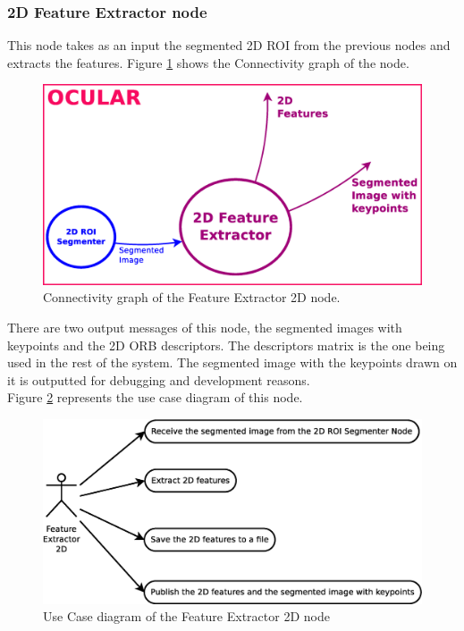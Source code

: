 
\subsubsection{2D Feature Extractor node}

	This node takes as an input the segmented 2D ROI from the previous nodes and extracts the features. 
	Figure \ref{node_fe2d} shows the Connectivity graph of the node. 

		\begin{figure}[H]
			\begin{center}
			\includegraphics[width=0.5\linewidth]{img/diagrams/node_fe2d.eps}
			\caption[Feature Extractor 2D node I/O]{Connectivity graph of the Feature Extractor 2D node.}		
			\label{node_fe2d}
			\end{center}
		\end{figure}

	There are two output messages of this node, the segmented images with keypoints and the 2D ORB descriptors. 
	The descriptors matrix is the one being used in the rest of the system. 
	The segmented image with the keypoints drawn on it is outputted for debugging and development reasons. 
	\\

	Figure  \ref{uc_fe2d} represents the use case diagram of this node. 
	\begin{figure}[H]
		\centering
			\includegraphics[scale=0.4]{img/diagrams/uc_feature_extractor_2d.eps}
			\caption[Use case diagram Feature Extractor 2D node]{Use Case diagram of the Feature Extractor 2D node}
		\label{uc_fe2d}
	\end{figure}

